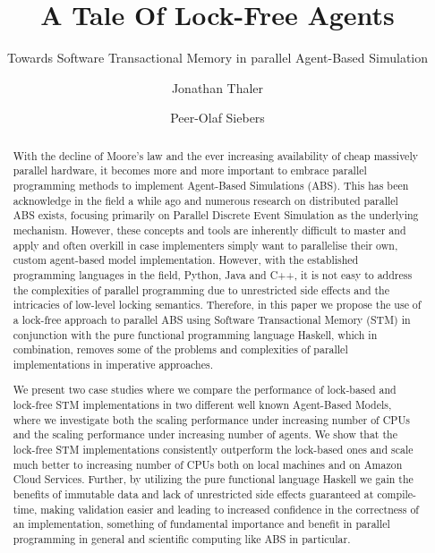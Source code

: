 \documentclass[format=acmsmall, review=true, screen=true]{acmart}
\begin{document}


\title[A Tale Of Lock-Free Agents]{A Tale Of Lock-Free Agents}
\subtitle{Towards Software Transactional Memory in parallel Agent-Based Simulation}

\author{Jonathan Thaler}
\author{Peer-Olaf Siebers}

\begin{abstract}
With the decline of Moore's law and the ever increasing availability of cheap massively parallel hardware, it becomes more and more important to embrace parallel programming methods to implement Agent-Based Simulations (ABS). This has been acknowledge in the field a while ago and numerous research on distributed parallel ABS exists, focusing primarily on Parallel Discrete Event Simulation as the underlying mechanism. However, these concepts and tools are inherently difficult to master and apply and often overkill in case implementers simply want to parallelise their own, custom agent-based model implementation. However, with the established programming languages in the field, Python, Java and C++, it is not easy to address the complexities of parallel programming due to unrestricted side effects and the intricacies of low-level locking semantics. Therefore, in this paper we propose the use of a lock-free approach to parallel ABS using Software Transactional Memory (STM) in conjunction with the pure functional programming language Haskell, which in combination, removes some of the problems and complexities of parallel implementations in imperative approaches.

We present two case studies where we compare the performance of lock-based and lock-free STM implementations in two different well known Agent-Based Models, where we investigate both the scaling performance under increasing number of CPUs and the scaling performance under increasing number of agents. We show that the lock-free STM implementations consistently outperform the lock-based ones and scale much better to increasing number of CPUs both on local machines and on Amazon Cloud Services. Further, by utilizing the pure functional language Haskell we gain the benefits of immutable data and lack of unrestricted side effects guaranteed at compile-time, making validation easier and leading to increased confidence in the correctness of an implementation, something of fundamental importance and benefit in parallel programming in general and scientific computing like ABS in particular.
\end{abstract}
\end{document}
